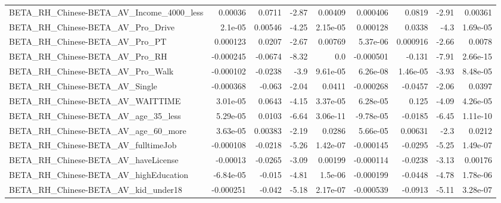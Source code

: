 \begin{tabular}{lrrrrrrrr}
BETA\_RH\_Chinese-BETA\_AV\_Income\_4000\_less           &     0.00036 &       0.0711 &     -2.87 &  0.00409 &   0.000406 &      0.0819 &        -2.91 &       0.00361 \\
BETA\_RH\_Chinese-BETA\_AV\_Pro\_Drive                  &     2.1e-05 &      0.00546 &     -4.25 & 2.15e-05 &   0.000128 &      0.0338 &         -4.3 &      1.69e-05 \\
BETA\_RH\_Chinese-BETA\_AV\_Pro\_PT                     &    0.000123 &       0.0207 &     -2.67 &  0.00769 &   5.37e-06 &    0.000916 &        -2.66 &        0.0078 \\
BETA\_RH\_Chinese-BETA\_AV\_Pro\_RH                     &   -0.000245 &      -0.0674 &     -8.32 &      0.0 &  -0.000501 &      -0.131 &        -7.91 &      2.66e-15 \\
BETA\_RH\_Chinese-BETA\_AV\_Pro\_Walk                   &   -0.000102 &      -0.0238 &      -3.9 & 9.61e-05 &   6.26e-08 &    1.46e-05 &        -3.93 &      8.48e-05 \\
BETA\_RH\_Chinese-BETA\_AV\_Single                     &   -0.000368 &       -0.063 &     -2.04 &   0.0411 &  -0.000268 &     -0.0457 &        -2.06 &        0.0397 \\
BETA\_RH\_Chinese-BETA\_AV\_WAITTIME                   &    3.01e-05 &       0.0643 &     -4.15 & 3.37e-05 &   6.28e-05 &       0.125 &        -4.09 &      4.26e-05 \\
BETA\_RH\_Chinese-BETA\_AV\_age\_35\_less                &    5.29e-05 &       0.0103 &     -6.64 & 3.06e-11 &  -9.78e-05 &     -0.0185 &        -6.45 &      1.11e-10 \\
BETA\_RH\_Chinese-BETA\_AV\_age\_60\_more                &    3.63e-05 &      0.00383 &     -2.19 &   0.0286 &   5.66e-05 &     0.00631 &         -2.3 &        0.0212 \\
BETA\_RH\_Chinese-BETA\_AV\_fulltimeJob                &   -0.000108 &      -0.0218 &     -5.26 & 1.42e-07 &  -0.000145 &     -0.0295 &        -5.25 &      1.49e-07 \\
BETA\_RH\_Chinese-BETA\_AV\_haveLicense                &    -0.00013 &      -0.0265 &     -3.09 &  0.00199 &  -0.000114 &     -0.0238 &        -3.13 &       0.00176 \\
BETA\_RH\_Chinese-BETA\_AV\_highEducation              &   -6.84e-05 &       -0.015 &     -4.81 &  1.5e-06 &  -0.000199 &     -0.0448 &        -4.78 &      1.78e-06 \\
BETA\_RH\_Chinese-BETA\_AV\_kid\_under18                &   -0.000251 &       -0.042 &     -5.18 & 2.17e-07 &  -0.000539 &     -0.0913 &        -5.11 &      3.28e-07 \\

\end{tabular}
